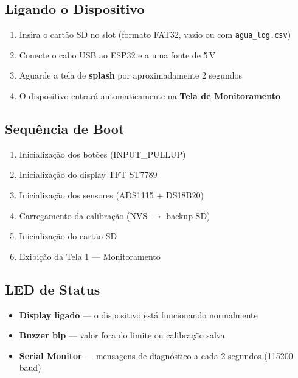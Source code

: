 \documentclass[12pt,a4paper]{article}
\begin{document}
\subsection{Ligando o Dispositivo}

\begin{enumerate}[nosep]
  \item Insira o cartão SD no slot (formato FAT32, vazio ou com \texttt{agua\_log.csv})
  \item Conecte o cabo USB ao ESP32 e a uma fonte de 5\,V
  \item Aguarde a tela de \textbf{splash} por aproximadamente 2 segundos
  \item O dispositivo entrará automaticamente na \textbf{Tela de Monitoramento}
\end{enumerate}

\subsection{Sequência de Boot}

\begin{enumerate}[nosep]
  \item Inicialização dos botões (INPUT\_PULLUP)
  \item Inicialização do display TFT ST7789
  \item Inicialização dos sensores (ADS1115 + DS18B20)
  \item Carregamento da calibração (NVS $\rightarrow$ backup SD)
  \item Inicialização do cartão SD
  \item Exibição da Tela 1 --- Monitoramento
\end{enumerate}

\subsection{LED de Status}

\begin{itemize}[nosep]
  \item \textbf{Display ligado} --- o dispositivo está funcionando normalmente
  \item \textbf{Buzzer bip} --- valor fora do limite ou calibração salva
  \item \textbf{Serial Monitor} --- mensagens de diagnóstico a cada 2 segundos (115200 baud)
\end{itemize}

\end{document}
